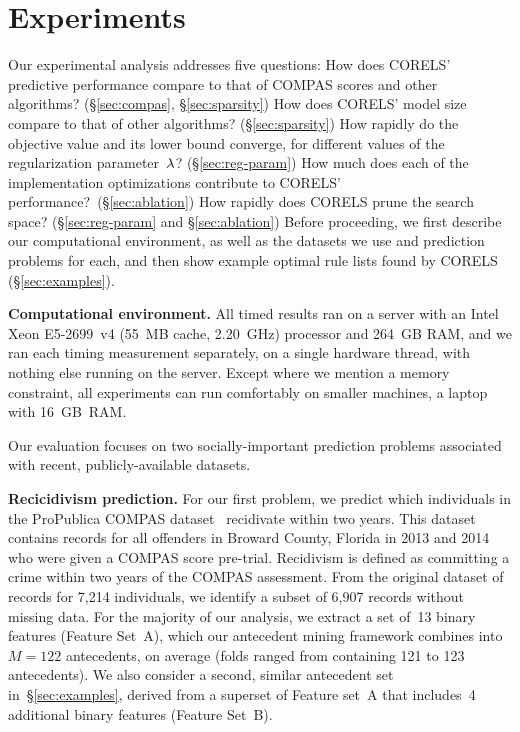 \section{Experiments}
\label{sec:experiments}

Our experimental analysis addresses five questions:
%
How does CORELS' predictive performance compare to that of COMPAS scores
and other algorithms? (\S\ref{sec:compas}, \S\ref{sec:sparsity})
%
How does CORELS' model size compare to that of other algorithms? (\S\ref{sec:sparsity})
%
How rapidly do the objective value and its lower bound converge,
for different values of the regularization parameter~${\lambda}$? (\S\ref{sec:reg-param})
%
How much does each of the implementation optimizations contribute to CORELS' performance?~(\S\ref{sec:ablation})
%
How rapidly does CORELS prune the search space? (\S\ref{sec:reg-param} and \S\ref{sec:ablation})
%
Before proceeding, we first describe our computational environment,
as well as the datasets we use and prediction problems for each,
and then show example optimal rule lists found by CORELS (\S\ref{sec:examples}).

\textbf{Computational environment.}
All timed results ran on a server with an Intel Xeon E5-2699~v4 (55~MB cache, 2.20~GHz) processor and 264~GB RAM,
and we ran each timing measurement separately, on a single hardware thread, with nothing else running on the server.
%
Except where we mention a memory constraint, all experiments
can run comfortably on smaller machines, \eg a laptop with 16~GB~RAM.

Our evaluation focuses on two socially-important prediction problems associated
with recent, publicly-available datasets.

\textbf{Recicidivism prediction.}
For our first problem, we predict which individuals in the ProPublica COMPAS
dataset~\citep{LarsonMaKiAn16} recidivate within two years.
This dataset contains records for all offenders in Broward County, Florida
in 2013 and 2014 who were given a COMPAS score pre-trial.
Recidivism is defined as committing a crime within two years of the COMPAS
assessment.
%
From the original dataset of records for 7,214 individuals,
we identify a subset of 6,907 records without missing data.
%
For the majority of our analysis, we extract a set of~13 binary features (Feature Set~A),
which our antecedent mining framework combines into ${M=122}$ antecedents,
on average (folds ranged from containing 121 to 123 antecedents).
%
We also consider a second, similar antecedent set in~\S\ref{sec:examples},
derived from a superset of Feature set~A that includes~4 additional binary features (Feature Set~B).

